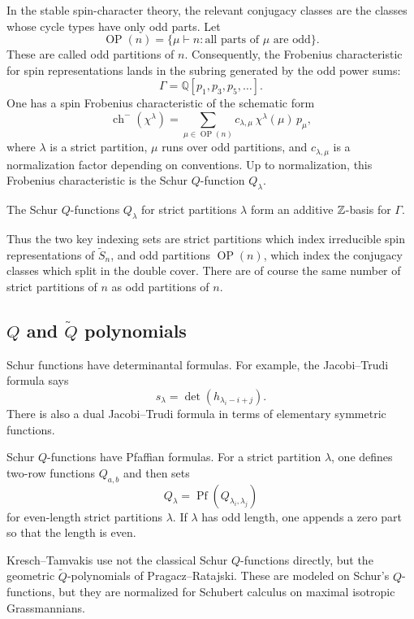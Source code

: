 \documentclass[12pt]{article}
\begin{document}
In the stable spin-character theory, the relevant conjugacy classes are the classes whose cycle types have only odd parts. Let
\[
    \operatorname{OP}(n)
    =
    \{\mu\vdash n : \text{all parts of }\mu\text{ are odd}\}.
\]
These are called odd partitions of $n$. Consequently, the Frobenius characteristic for spin representations lands in the subring generated by the odd power sums:
\[
    \Gamma
    =
    \mathbb Q[p_1,p_3,p_5,\dots].
\]
One has a spin Frobenius characteristic of the schematic form
\[
    \operatorname{ch}^{-}(\chi^\lambda)
    =
    \sum_{\mu\in \operatorname{OP}(n)}
    c_{\lambda,\mu}\,
    \chi^\lambda(\mu)\,
    p_\mu,
\]
where $\lambda$ is a strict partition, $\mu$ runs over odd partitions, and $c_{\lambda,\mu}$ is a normalization factor depending on conventions. Up to normalization, this Frobenius characteristic is the Schur $Q$-function $Q_\lambda$.

\begin{theorem}
    The Schur $Q$-functions $Q_\lambda$ for strict partitions $\lambda$ form an additive $\mathbb{Z}$-basis for $\Gamma$.
\end{theorem}

Thus the two key indexing sets are strict partitions which index irreducible spin representations of $\widetilde S_n$, and odd partitions $\operatorname{OP}(n)$, which index the conjugacy classes which split in the double cover. There are of course the same number of strict partitions of $n$ as odd partitions of $n$.

\subsection{$Q$ and $\widetilde Q$ polynomials}

Schur functions have determinantal formulas. For example, the Jacobi--Trudi formula says
\[
    s_\lambda
    =
    \det\left(h_{\lambda_i-i+j}\right).
\]
There is also a dual Jacobi--Trudi formula in terms of elementary symmetric functions.

Schur $Q$-functions have Pfaffian formulas. For a strict partition $\lambda$, one defines two-row functions $Q_{a,b}$ and then sets
\[
    Q_\lambda
    =
    \operatorname{Pf}
    \left(
    Q_{\lambda_i,\lambda_j}
    \right)
\] for even-length strict partitions $\lambda$. If $\lambda$ has odd length, one appends a zero part so that the length is even.

Kresch--Tamvakis use not the classical Schur $Q$-functions directly, but the geometric $\widetilde Q$-polynomials of Pragacz--Ratajski. These are modeled on Schur's $Q$-functions, but they are normalized for Schubert calculus on maximal isotropic Grassmannians.
\end{document}
